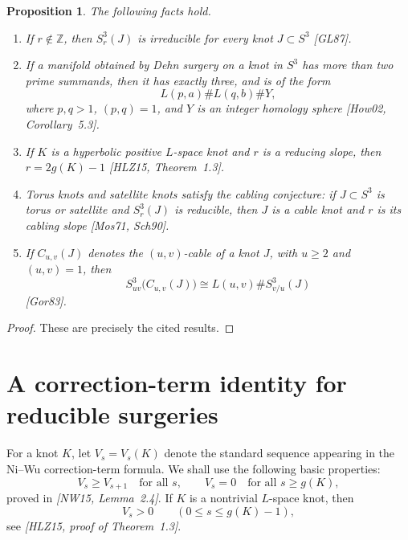 \documentclass[11pt]{article}
\newtheorem{proposition}[theorem]{Proposition}
\begin{document}
\begin{proposition}\label{prop:standard}
The following facts hold.
\begin{enumerate}[label=\textup{(\roman*)}]
\item
If \(r\notin \mathbb{Z}\), then \(S^{3}_{r}(J)\) is irreducible for every knot
\(J\subset S^{3}\) \emph{[GL87]}.

\item
If a manifold obtained by Dehn surgery on a knot in \(S^{3}\) has more than two
prime summands, then it has exactly three, and is of the form
\[
L(p,a)\# L(q,b)\# Y,
\]
where \(p,q>1\), \((p,q)=1\), and \(Y\) is an integer homology sphere
\emph{[How02, Corollary~5.3]}.

\item
If \(K\) is a hyperbolic positive \(L\)-space knot and \(r\) is a reducing slope,
then \(r=2g(K)-1\) \emph{[HLZ15, Theorem~1.3]}.

\item
Torus knots and satellite knots satisfy the cabling conjecture:
if \(J\subset S^{3}\) is torus or satellite and \(S^{3}_{r}(J)\) is reducible,
then \(J\) is a cable knot and \(r\) is its cabling slope
\emph{[Mos71, Sch90]}.

\item
If \(C_{u,v}(J)\) denotes the \((u,v)\)-cable of a knot \(J\), with
\(u\ge 2\) and \((u,v)=1\), then
\[
S^{3}_{uv}\!\bigl(C_{u,v}(J)\bigr)\cong L(u,v)\# S^{3}_{v/u}(J)
\]
\emph{[Gor83]}.
\end{enumerate}
\end{proposition}

\begin{proof}
These are precisely the cited results.
\end{proof}

\section{A correction-term identity for reducible surgeries}

For a knot \(K\), let \(V_{s}=V_{s}(K)\) denote the standard sequence appearing in the
Ni--Wu correction-term formula.
We shall use the following basic properties:
\begin{equation}\label{eq:V-basic}
V_{s}\ge V_{s+1}\quad\text{for all }s,\qquad
V_{s}=0\quad\text{for all }s\ge g(K),
\end{equation}
proved in \emph{[NW15, Lemma~2.4]}.
If \(K\) is a nontrivial \(L\)-space knot, then
\begin{equation}\label{eq:V-positive}
V_{s}>0\qquad (0\le s\le g(K)-1),
\end{equation}
see \emph{[HLZ15, proof of Theorem~1.3]}.
\end{document}
